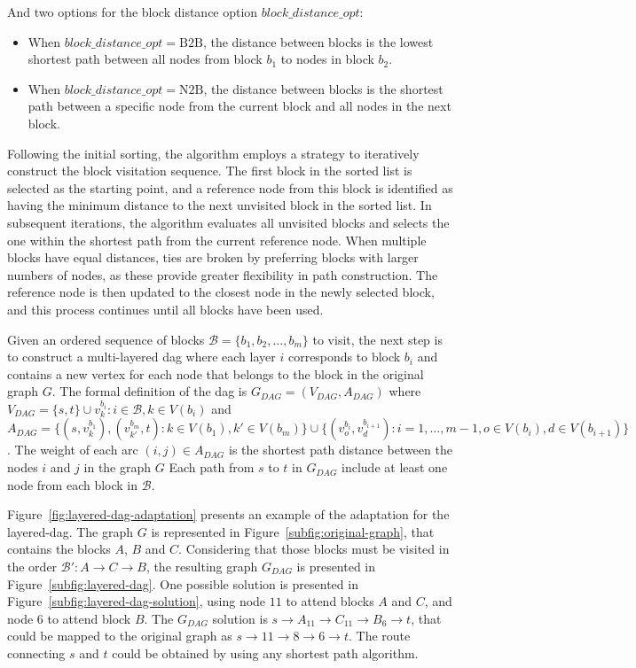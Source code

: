 And two options for the block distance option $block\_distance\_opt$:
\begin{itemize}
	\item When $block\_distance\_opt = \text{B2B}$, the distance between blocks is the lowest shortest path between all nodes from block $b_1$ to nodes in block $b_2$.
	\item When $block\_distance\_opt = \text{N2B}$, the distance between blocks is the shortest path between a specific node from the current block and all nodes in the next block.
\end{itemize}

Following the initial sorting, the algorithm employs a strategy to iteratively construct the block visitation sequence. The first block in the sorted list is selected as the starting point, and a reference node from this block is identified as having the minimum distance to the next unvisited block in the sorted list. In subsequent iterations, the algorithm evaluates all unvisited blocks and selects the one within the shortest path from the current reference node. When multiple blocks have equal distances, ties are broken by preferring blocks with larger numbers of nodes, as these provide greater flexibility in path construction. The reference node is then updated to the closest node in the newly selected block, and this process continues until all blocks have been used.

Given an ordered sequence of blocks $\mathcal{B} = \{b_1, b_2, \ldots, b_m\}$ to visit, the next step is to construct a multi-layered \gls{dag} where each layer $i$ corresponds to block $b_i$ and contains a new vertex for each node that belongs to the block in the original graph $G$. The formal definition of the \gls{dag} is $G_{DAG} = (V_{DAG}, A_{DAG})$ where $V_{DAG} = \{s, t\} \cup v^{b_i}_k: i \in \mathcal{B}, k \in V(b_i)$ and $A_{DAG} = \{(s, v^{b_1}_{k}), (v^{b_m}_{k'}, t): k \in V(b_1), k' \in V(b_m)\} \cup \{(v^{b_i}_o, v^{b_{i+1}}_{d}): i = 1, \ldots, m-1, o \in V(b_i), d \in V(b_{i+1})\}$.  The weight of each arc $(i, j) \in A_{DAG}$ is the shortest path distance between the nodes $i$ and $j$ in the graph $G$ Each path from $s$ to $t$ in $G_{DAG}$ include at least one node from each block in $\mathcal{B}$.

Figure~\ref{fig:layered-dag-adaptation} presents an example of the adaptation for the layered-dag. The graph $G$ is represented in Figure~\ref{subfig:original-graph}, that contains the blocks $A$, $B$ and $C$. Considering that those blocks must be visited in the order $\mathcal{B}': A \rightarrow C \rightarrow B$, the resulting graph $G_{DAG}$ is presented in Figure~\ref{subfig:layered-dag}. One possible solution is presented in Figure~\ref{subfig:layered-dag-solution}, using node $11$ to attend blocks $A$ and $C$, and node $6$ to attend block $B$. The $G_{DAG}$ solution is $s \rightarrow A_{11} \rightarrow C_{11} \rightarrow B_{6} \rightarrow t$, that could be mapped to the original graph as $s \rightarrow 11 \rightarrow 8 \rightarrow 6 \rightarrow t$. The route connecting $s$ and $t$ could be obtained by using any shortest path algorithm.

